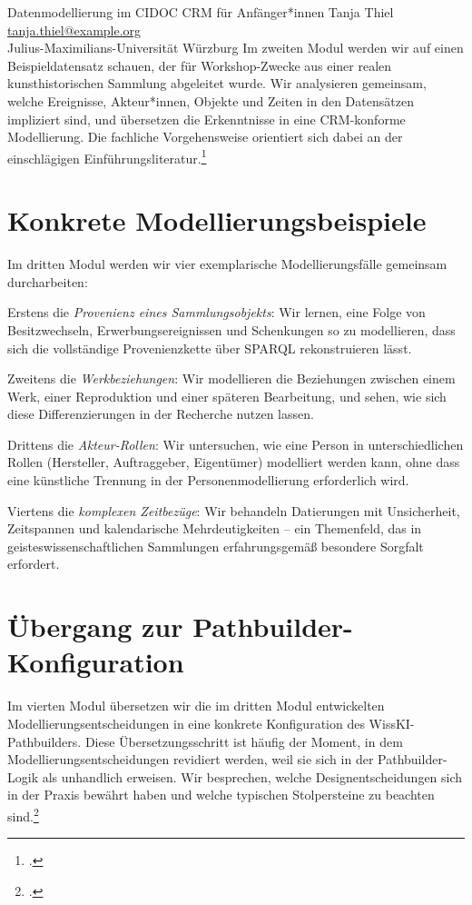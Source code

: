 \begin{beitrag}{Datenmodellierung im CIDOC CRM für Anfänger*innen}{%
Tanja Thiel\, \\
\small \href{mailto:tanja.thiel@example.org}{tanja.thiel@example.org} \\
\small Julius-Maximilians-Universität Würzburg
}
Im zweiten Modul werden wir auf einen Beispieldatensatz schauen, der für Workshop-Zwecke aus einer realen kunsthistorischen Sammlung abgeleitet wurde. Wir analysieren gemeinsam, welche Ereignisse, Akteur*innen, Objekte und Zeiten in den Datensätzen impliziert sind, und übersetzen die Erkenntnisse in eine CRM-konforme Modellierung. Die fachliche Vorgehensweise orientiert sich dabei an der einschlägigen Einführungsliteratur.\footcite[63--65]{thiel2024-crm-einfuehrung}

\section{Konkrete Modellierungsbeispiele}
Im dritten Modul werden wir vier exemplarische Modellierungsfälle gemeinsam durcharbeiten:

Erstens die \emph{Provenienz eines Sammlungsobjekts}: Wir lernen, eine Folge von Besitzwechseln, Erwerbungsereignissen und Schenkungen so zu modellieren, dass sich die vollständige Provenienzkette über SPARQL rekonstruieren lässt.

Zweitens die \emph{Werkbeziehungen}: Wir modellieren die Beziehungen zwischen einem Werk, einer Reproduktion und einer späteren Bearbeitung, und sehen, wie sich diese Differenzierungen in der Recherche nutzen lassen.

Drittens die \emph{Akteur-Rollen}: Wir untersuchen, wie eine Person in unterschiedlichen Rollen (Hersteller, Auftraggeber, Eigentümer) modelliert werden kann, ohne dass eine künstliche Trennung in der Personenmodellierung erforderlich wird.

Viertens die \emph{komplexen Zeitbezüge}: Wir behandeln Datierungen mit Unsicherheit, Zeitspannen und kalendarische Mehrdeutigkeiten -- ein Themenfeld, das in geisteswissenschaftlichen Sammlungen erfahrungsgemäß besondere Sorgfalt erfordert.

\section{Übergang zur Pathbuilder-Konfiguration}
Im vierten Modul übersetzen wir die im dritten Modul entwickelten Modellierungsentscheidungen in eine konkrete Konfiguration des WissKI-Pathbuilders. Diese Übersetzungsschritt ist häufig der Moment, in dem Modellierungsentscheidungen revidiert werden, weil sie sich in der Pathbuilder-Logik als unhandlich erweisen. Wir besprechen, welche Designentscheidungen sich in der Praxis bewährt haben und welche typischen Stolpersteine zu beachten sind.\footcite[vgl.][24]{thiel2025-pathbuilder-praxis}


\end{beitrag}

